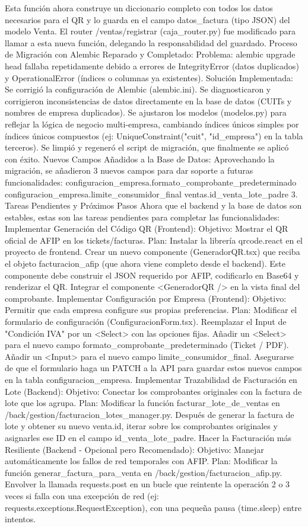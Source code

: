 Esta función ahora construye un diccionario completo con todos los datos necesarios para el QR y lo guarda en el campo datos_factura (tipo JSON) del modelo Venta.
El router /ventas/registrar (caja_router.py) fue modificado para llamar a esta nueva función, delegando la responsabilidad del guardado.
Proceso de Migración con Alembic Reparado y Completado:
Problema: alembic upgrade head fallaba repetidamente debido a errores de IntegrityError (datos duplicados) y OperationalError (índices o columnas ya existentes).
Solución Implementada:
Se corrigió la configuración de Alembic (alembic.ini).
Se diagnosticaron y corrigieron inconsistencias de datos directamente en la base de datos (CUITs y nombres de empresa duplicados).
Se ajustaron los modelos (modelos.py) para reflejar la lógica de negocio multi-empresa, cambiando índices únicos simples por índices únicos compuestos (ej: UniqueConstraint("cuit", "id_empresa") en la tabla terceros).
Se limpió y regeneró el script de migración, que finalmente se aplicó con éxito.
Nuevos Campos Añadidos a la Base de Datos:
Aprovechando la migración, se añadieron 3 nuevos campos para dar soporte a futuras funcionalidades:
configuracion_empresa.formato_comprobante_predeterminado
configuracion_empresa.limite_consumidor_final
ventas.id_venta_lote_padre
3. Tareas Pendientes y Próximos Pasos
Ahora que el backend y la base de datos son estables, estas son las tareas pendientes para completar las funcionalidades:
Implementar Generación del Código QR (Frontend):
Objetivo: Mostrar el QR oficial de AFIP en los tickets/facturas.
Plan:
Instalar la librería qrcode.react en el proyecto de frontend.
Crear un nuevo componente (GeneradorQR.tsx) que reciba el objeto facturacion_afip (que ahora viene completo desde el backend).
Este componente debe construir el JSON requerido por AFIP, codificarlo en Base64 y renderizar el QR.
Integrar el componente <GeneradorQR /> en la vista final del comprobante.
Implementar Configuración por Empresa (Frontend):
Objetivo: Permitir que cada empresa configure sus propias preferencias.
Plan:
Modificar el formulario de configuración (ConfiguracionForm.tsx).
Reemplazar el Input de "Condición IVA" por un <Select> con las opciones fijas.
Añadir un <Select> para el nuevo campo formato_comprobante_predeterminado (Ticket / PDF).
Añadir un <Input> para el nuevo campo limite_consumidor_final.
Asegurarse de que el formulario haga un PATCH a la API para guardar estos nuevos campos en la tabla configuracion_empresa.
Implementar Trazabilidad de Facturación en Lote (Backend):
Objetivo: Conectar los comprobantes originales con la factura de lote que los agrupa.
Plan:
Modificar la función facturar_lote_de_ventas en /back/gestion/facturacion_lotes_manager.py.
Después de generar la factura de lote y obtener su nuevo venta.id, iterar sobre los comprobantes originales y asignarles ese ID en el campo id_venta_lote_padre.
Hacer la Facturación más Resiliente (Backend - Opcional pero Recomendado):
Objetivo: Manejar automáticamente los fallos de red temporales con AFIP.
Plan:
Modificar la función generar_factura_para_venta en /back/gestion/facturacion_afip.py.
Envolver la llamada requests.post en un bucle que reintente la operación 2 o 3 veces si falla con una excepción de red (ej: requests.exceptions.RequestException), con una pequeña pausa (time.sleep) entre intentos.